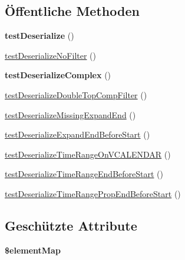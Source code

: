 \subsection*{Öffentliche Methoden}
\begin{DoxyCompactItemize}
\item 
\mbox{\label{class_sabre_1_1_cal_d_a_v_1_1_xml_1_1_request_1_1_calendar_query_report_test_ad1b26ae0647827fab92455fafcfb87c1}} 
{\bfseries test\+Deserialize} ()
\item 
\mbox{\hyperlink{class_sabre_1_1_cal_d_a_v_1_1_xml_1_1_request_1_1_calendar_query_report_test_a40e05582547695df4de7f06d41aab8b2}{test\+Deserialize\+No\+Filter}} ()
\item 
\mbox{\label{class_sabre_1_1_cal_d_a_v_1_1_xml_1_1_request_1_1_calendar_query_report_test_a70f82e001aa1d694404c33a2c790ca75}} 
{\bfseries test\+Deserialize\+Complex} ()
\item 
\mbox{\hyperlink{class_sabre_1_1_cal_d_a_v_1_1_xml_1_1_request_1_1_calendar_query_report_test_a1176da59e264c087c89a2865a801da09}{test\+Deserialize\+Double\+Top\+Comp\+Filter}} ()
\item 
\mbox{\hyperlink{class_sabre_1_1_cal_d_a_v_1_1_xml_1_1_request_1_1_calendar_query_report_test_ad69c05d97194201c30fa71a09bbefbf2}{test\+Deserialize\+Missing\+Expand\+End}} ()
\item 
\mbox{\hyperlink{class_sabre_1_1_cal_d_a_v_1_1_xml_1_1_request_1_1_calendar_query_report_test_a1c13362d288a34fa147fb1f451870709}{test\+Deserialize\+Expand\+End\+Before\+Start}} ()
\item 
\mbox{\hyperlink{class_sabre_1_1_cal_d_a_v_1_1_xml_1_1_request_1_1_calendar_query_report_test_a3cffd15660f405f9fa381ea17ea3697a}{test\+Deserialize\+Time\+Range\+On\+V\+C\+A\+L\+E\+N\+D\+AR}} ()
\item 
\mbox{\hyperlink{class_sabre_1_1_cal_d_a_v_1_1_xml_1_1_request_1_1_calendar_query_report_test_a2880042bfdb8475d9d69470a96e59185}{test\+Deserialize\+Time\+Range\+End\+Before\+Start}} ()
\item 
\mbox{\hyperlink{class_sabre_1_1_cal_d_a_v_1_1_xml_1_1_request_1_1_calendar_query_report_test_ad3b61d7ff0db40c1aaa469df7c338c5f}{test\+Deserialize\+Time\+Range\+Prop\+End\+Before\+Start}} ()
\end{DoxyCompactItemize}
\subsection*{Geschützte Attribute}
\begin{DoxyCompactItemize}
\item 
{\bfseries \$element\+Map}
\end{DoxyCompactItemize}


